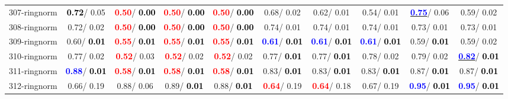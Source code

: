 \begin{table}[h]
\begin{center}
{\begin{tabular}{lc|c|c|c|c|c|c|c|c}
307-ringnorm & \textcolor{black}{\textbf{  0.72}}/  0.05 & \textcolor{red}{\textbf{  0.50}}/\textcolor{black}{\textbf{  0.00}} & \textcolor{red}{\textbf{  0.50}}/\textcolor{black}{\textbf{  0.00}} & \textcolor{red}{\textbf{  0.50}}/\textcolor{black}{\textbf{  0.00}} &   0.68/  0.02 &   0.62/  0.01 &   0.54/  0.01 & \underline{\textcolor{blue}{\textbf{  0.75}}}/  0.06 &   0.59/  0.02 \\
308-ringnorm &   0.72/  0.02 & \textcolor{red}{\textbf{  0.50}}/\textcolor{black}{\textbf{  0.00}} & \textcolor{red}{\textbf{  0.50}}/\textcolor{black}{\textbf{  0.00}} & \textcolor{red}{\textbf{  0.50}}/\textcolor{black}{\textbf{  0.00}} &   0.74/  0.01 &   0.74/  0.01 &   0.74/  0.01 &   0.73/  0.01 &   0.73/  0.01 \\
309-ringnorm &   0.60/\textcolor{black}{\textbf{  0.01}} & \textcolor{red}{\textbf{  0.55}}/\textcolor{black}{\textbf{  0.01}} & \textcolor{red}{\textbf{  0.55}}/\textcolor{black}{\textbf{  0.01}} & \textcolor{red}{\textbf{  0.55}}/\textcolor{black}{\textbf{  0.01}} & \textcolor{blue}{\textbf{  0.61}}/\textcolor{black}{\textbf{  0.01}} & \textcolor{blue}{\textbf{  0.61}}/\textcolor{black}{\textbf{  0.01}} & \textcolor{blue}{\textbf{  0.61}}/\textcolor{black}{\textbf{  0.01}} &   0.59/\textcolor{black}{\textbf{  0.01}} &   0.59/  0.02 \\ \hline
310-ringnorm &   0.77/  0.02 & \textcolor{red}{\textbf{  0.52}}/  0.03 & \textcolor{red}{\textbf{  0.52}}/  0.02 & \textcolor{red}{\textbf{  0.52}}/  0.02 &   0.77/\textcolor{black}{\textbf{  0.01}} &   0.77/\textcolor{black}{\textbf{  0.01}} &   0.78/  0.02 &   0.79/  0.02 & \underline{\textcolor{blue}{\textbf{  0.82}}}/\textcolor{black}{\textbf{  0.01}} \\
311-ringnorm & \textcolor{blue}{\textbf{  0.88}}/\textcolor{black}{\textbf{  0.01}} & \textcolor{red}{\textbf{  0.58}}/\textcolor{black}{\textbf{  0.01}} & \textcolor{red}{\textbf{  0.58}}/\textcolor{black}{\textbf{  0.01}} & \textcolor{red}{\textbf{  0.58}}/\textcolor{black}{\textbf{  0.01}} &   0.83/\textcolor{black}{\textbf{  0.01}} &   0.83/\textcolor{black}{\textbf{  0.01}} &   0.83/\textcolor{black}{\textbf{  0.01}} &   0.87/\textcolor{black}{\textbf{  0.01}} &   0.87/\textcolor{black}{\textbf{  0.01}} \\
312-ringnorm &   0.66/  0.19 &   0.88/  0.06 &   0.89/\textcolor{black}{\textbf{  0.01}} &   0.88/\textcolor{black}{\textbf{  0.01}} & \textcolor{red}{\textbf{  0.64}}/  0.19 & \textcolor{red}{\textbf{  0.64}}/  0.18 &   0.67/  0.19 & \textcolor{blue}{\textbf{  0.95}}/\textcolor{black}{\textbf{  0.01}} & \textcolor{blue}{\textbf{  0.95}}/\textcolor{black}{\textbf{  0.01}} \\

\end{tabular}}
\end{center}
\end{table}
